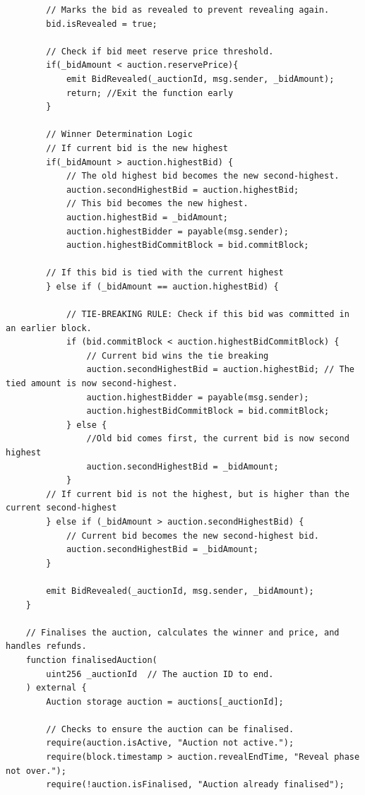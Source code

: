 \documentclass[11pt, a4paper]{article}
\begin{document}
\begin{lstlisting}
        // Marks the bid as revealed to prevent revealing again.
        bid.isRevealed = true;

        // Check if bid meet reserve price threshold.
        if(_bidAmount < auction.reservePrice){
            emit BidRevealed(_auctionId, msg.sender, _bidAmount);
            return; //Exit the function early
        }

        // Winner Determination Logic
        // If current bid is the new highest
        if(_bidAmount > auction.highestBid) {
            // The old highest bid becomes the new second-highest.
            auction.secondHighestBid = auction.highestBid;
            // This bid becomes the new highest.
            auction.highestBid = _bidAmount;
            auction.highestBidder = payable(msg.sender);
            auction.highestBidCommitBlock = bid.commitBlock;

        // If this bid is tied with the current highest
        } else if (_bidAmount == auction.highestBid) {

            // TIE-BREAKING RULE: Check if this bid was committed in an earlier block.
            if (bid.commitBlock < auction.highestBidCommitBlock) {
                // Current bid wins the tie breaking
                auction.secondHighestBid = auction.highestBid; // The tied amount is now second-highest.
                auction.highestBidder = payable(msg.sender);
                auction.highestBidCommitBlock = bid.commitBlock;
            } else {
                //Old bid comes first, the current bid is now second highest
                auction.secondHighestBid = _bidAmount;
            }
        // If current bid is not the highest, but is higher than the current second-highest
        } else if (_bidAmount > auction.secondHighestBid) {
            // Current bid becomes the new second-highest bid.
            auction.secondHighestBid = _bidAmount;
        }

        emit BidRevealed(_auctionId, msg.sender, _bidAmount);
    }

    // Finalises the auction, calculates the winner and price, and handles refunds.
    function finalisedAuction(
        uint256 _auctionId  // The auction ID to end.
    ) external {
        Auction storage auction = auctions[_auctionId];

        // Checks to ensure the auction can be finalised.
        require(auction.isActive, "Auction not active.");
        require(block.timestamp > auction.revealEndTime, "Reveal phase not over.");
        require(!auction.isFinalised, "Auction already finalised");


\end{lstlisting}
\end{document}
